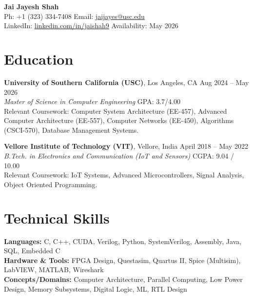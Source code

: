 \documentclass[letterpaper,10pt]{article}
\begin{document}
\begin{center}
    {\LARGE \textbf{Jai Jayesh Shah}} \\
    \vspace{2pt}
    \small
    Ph: +1 (323) 334-7408 \quad Email: \href{mailto:jaijayes@usc.edu}{jaijayes@usc.edu} \\
    LinkedIn: \href{https://www.linkedin.com/in/jaishah9}{linkedin.com/in/jaishah9} \quad Availability: May 2026 \\
    \vspace{-8pt}
\end{center}

\section*{Education}
\textbf{University of Southern California (USC)}, Los Angeles, CA \hfill Aug 2024 -- May 2026 \\
\textit{Master of Science in Computer Engineering} \hfill GPA: 3.7/4.00 \\
Relevant Coursework: Computer System Architecture (EE-457), Advanced Computer Architecture (EE-557), Computer Networks (EE-450), Algorithms (CSCI-570), Database Management Systems.

\vspace{1pt}

\textbf{Vellore Institute of Technology (VIT)}, Vellore, India \hfill April 2018 -- May 2022 \\
\textit{B.Tech. in Electronics and Communication (IoT and Sensors)} \hfill CGPA: 9.04 / 10.00 \\
Relevant Coursework: IoT Systems, Advanced Microcontrollers, Signal Analysis, Object Oriented Programming.

\section*{Technical Skills}
\textbf{Languages:} C, C++, CUDA, Verilog, Python, SystemVerilog, Assembly, Java, SQL, Embedded C \\
\textbf{Hardware \& Tools:} FPGA Design, Questasim, Quartus II, Spice (Multisim), LabVIEW, MATLAB, Wireshark \\
\textbf{Concepts/Domains:} Computer Architecture, Parallel Computing, Low Power Design, Memory Subsystems, Digital Logic, ML, RTL Design

\end{document}
